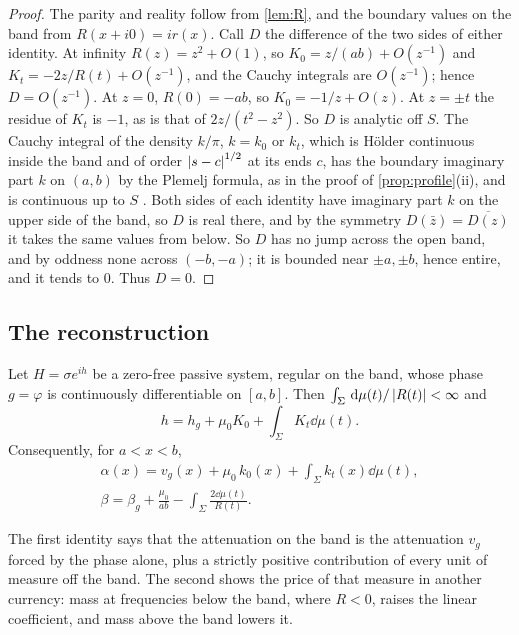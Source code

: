 \begin{proof}
The parity and reality follow from \cref{lem:R}, and the boundary values on
the band from $R(x+i0)=ir(x)$. Call $D$ the difference of the two sides of
either identity. At infinity $R(z)=z^2+O(1)$, so $K_0=z/(ab)+O(z^{-1})$ and
$K_t=-2z/R(t)+O(z^{-1})$, and the Cauchy integrals are $O(z^{-1})$; hence
$D=O(z^{-1})$. At $z=0$, $R(0)=-ab$, so $K_0=-1/z+O(z)$. At $z=\pm t$ the
residue of $K_t$ is $-1$, as is that of $2z/(t^2-z^2)$. So $D$ is analytic
off $S$. The Cauchy integral of the density $k/\pi$, $k=k_0$ or $k_t$,
which is H\"older continuous inside the band and of order $\left|s-c\right|^{1/2}$
at its ends $c$, has the boundary imaginary part $k$ on $(a,b)$ by the
Plemelj formula, as in the proof of \cref{prop:profile}(ii), and is
continuous up to $S$ \cite[Ch.~4]{muskhelishvili}. Both sides of each
identity have imaginary part $k$ on the upper side of the band, so $D$ is
real there, and by the symmetry $D(\bar z)=\overline{D(z)}$ it takes the same
values from below. So $D$ has no jump across the open band, and by oddness none across $(-b,-a)$; it is bounded near
$\pm a,\pm b$, hence entire, and it tends to $0$. Thus $D=0$.
\end{proof}

\subsection{The reconstruction}

\begin{theorem}\label{thm:reconstruction}
Let $H=\sigma e^{ih}$ be a zero-free passive system, regular on the band,
whose phase $g=\varphi$ is continuously differentiable on $[a,b]$. Then
$\int_\Sigma\,\mathrm d\mu(t)/\left|R(t)\right|<\infty$ and
\begin{equation}\label{eq:reconstruction}
h=h_g+\mu_0K_0+\int_\Sigma K_t\dd\mu(t).
\end{equation}
Consequently, for $a<x<b$,
\begin{gather}
\alpha(x)=v_g(x)+\mu_0\,k_0(x)+\int_\Sigma k_t(x)\dd\mu(t),\label{eq:positive}\\
\beta=\beta_g+\frac{\mu_0}{ab}-\int_\Sigma\frac{2\dd\mu(t)}{R(t)} .\label{eq:betarec}
\end{gather}
\end{theorem}

The first identity says that the attenuation on the band is the
attenuation $v_g$ forced by the phase alone, plus a strictly positive
contribution of every unit of measure off the band. The second shows the
price of that measure in another currency: mass at frequencies below the
band, where $R<0$, raises the linear coefficient, and mass above the band
lowers it.

